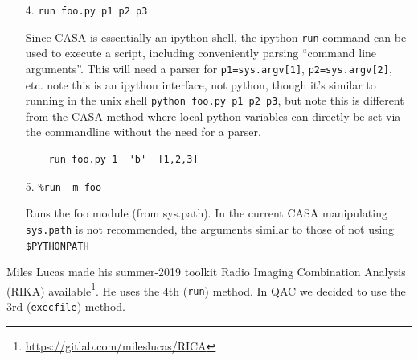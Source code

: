\documentclass[11pt,twoside]{article}
\begin{document}
\begin{itemize}

\footnotesize
\begin{verbatim}
    foo_bar(1,'b',[1,2,3])
\end{verbatim}
\normalsize


Incidentally, if these are combined and only one script needs to be executed and then analyzed
outside of CASA, a very efficient way it to use could be to call casa from the command line,
e.g. directly from bash (or via a Makefile):

\footnotesize
\begin{verbatim}
    % casa --nogui -c foo.py a=1 b='"b"' c='[1,2,3]' > foo.log 2&>1
\end{verbatim}
\normalsize

The overhead of setting up CASA before this script really starts work
varies a lot depending on cashing and what's in the casa init files, but can
be anywhere from 5 to 20 seconds. If many of these scripts are to be run, and each
only takes a short time, the overhead will be too large, and alternative method
will need to be employed (see below).



\item[4.]  \verb+run foo.py p1 p2 p3+

Since CASA is essentially an ipython shell, the ipython {\tt run} command can be used to execute
a script, including conveniently parsing ``command line arguments''.
This will need a parser for \verb+p1=sys.argv[1]+, \verb+p2=sys.argv[2]+, etc.
note this is an ipython interface, not python, though it's similar to
running in the unix shell \verb+python foo.py p1 p2 p3+, but note this is different
from the CASA method where local python variables can directly be set via the commandline
without the need for a parser.

\footnotesize
\begin{verbatim}
    run foo.py 1  'b'  [1,2,3]
\end{verbatim}
\normalsize

                           
\item[5.]   \verb+%run -m foo+

Runs the foo module (from sys.path). In the current CASA manipulating
{\tt sys.path} is not recommended, the arguments similar to those of not
using \verb+$PYTHONPATH+

\end{itemize}

Miles Lucas made his summer-2019 toolkit Radio Imaging Combination Analysis (RIKA)
available\footnote{\url{https://gitlab.com/mileslucas/RICA}}. He uses the 4th ({\tt run}) method.
In QAC we decided to use the 3rd ({\tt execfile}) method.
\end{document}
